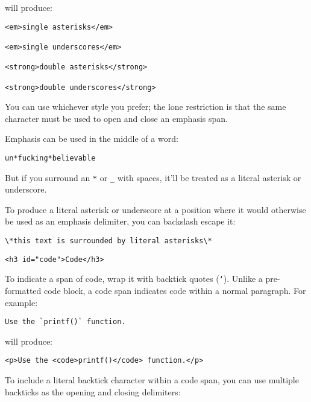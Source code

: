 will produce:

\begin{lstlisting}
<em>single asterisks</em>

<em>single underscores</em>

<strong>double asterisks</strong>

<strong>double underscores</strong>
\end{lstlisting}




You can use whichever style you prefer; the lone restriction is that
the same character must be used to open and close an emphasis span.



Emphasis can be used in the middle of a word:

\begin{lstlisting}
un*fucking*believable
\end{lstlisting}




But if you surround an \texttt{*} or \texttt{\_} with spaces, it'll be treated as a
literal asterisk or underscore.



To produce a literal asterisk or underscore at a position where it
would otherwise be used as an emphasis delimiter, you can backslash
escape it:

\begin{lstlisting}
\*this text is surrounded by literal asterisks\*
\end{lstlisting}


\begin{lstlisting}<h3 id="code">Code</h3>\end{lstlisting}




To indicate a span of code, wrap it with backtick quotes (\texttt{`}).
Unlike a pre-formatted code block, a code span indicates code within a
normal paragraph. For example:

\begin{lstlisting}
Use the `printf()` function.
\end{lstlisting}




will produce:

\begin{lstlisting}
<p>Use the <code>printf()</code> function.</p>
\end{lstlisting}




To include a literal backtick character within a code span, you can use
multiple backticks as the opening and closing delimiters:

